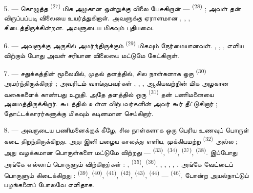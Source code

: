 5. --- கொழுத்த  \textsuperscript{(27)} மிக அழகான
 ஒன்றுக்கு விலை பேசுகிறான் —  \textsuperscript{(28)} ; அவள் தன் விருப்பப்படி விலையை
உயர்த்துகிறாள். அவளுக்கு ஏராளமான ,
, ,
 கிடைத்திருக்கின்றன. அவளுடைய
  மிகவும் புதியவை.

\VUsaut{4.0mm}
\VUsaut{3.0mm}

6. --- அவளுக்கு அருகில் அமர்ந்திருக்கும் 
\textsuperscript{(29)} மிகவும் நேர்மையானவள். ,
, , எளிய  விற்கும் போது அவள் சரியான விலையை மட்டுமே கேட்கிறாள்.

7. --- சதுக்கத்தின் மூலையில், முதல் தளத்தில், சில நாள்களாக ஒரு
 \textsuperscript{(30)} அமர்ந்திருக்கிறார் ;
அவரிடம் வாங்குபவர்கள் , , , 
ஆகியவற்றின் மிக அழகான வகைகளைக் காண்பது உறுதி. அதே தளத்தில் ஒரு
 \textsuperscript{(31)} தன் பணிமனையை
அமைத்திருக்கிறார். கூடத்தில் உள்ள விற்பவர்களின் 
அவர் கூர் தீட்டுகிறார் ; தோட்டக்காரர்களுக்கு மிகவும் கடினமான
  செய்கிறார்.

\VUsaut{4.0mm}
\VUsaut{3.0mm}

8. --- அவருடைய பணிமனைக்குக் கீழே, சில நாள்களாக ஒரு பெரிய உணவுப்
பொருள் கடை திறந்திருக்கிறது. அது இனி பழைய காலத்து எளிய,
முக்கியமற்ற  \textsuperscript{(32)} அல்ல ; அது
வழக்கமான பொருள்களை மட்டுமே விற்றது — 
\textsuperscript{(33)},  \textsuperscript{(34)},
 \textsuperscript{(37)}, 
\textsuperscript{(38)}. இப்போது அங்கே எல்லாப் பொருளும்
விற்கிறார்கள் : ,
 \textsuperscript{(35)},
 \textsuperscript{(36)}, ,
, , ,
. அங்கே வேட்டைப் பொருளும் கிடைக்கிறது :
 \textsuperscript{(39)}, 
\textsuperscript{(40)},  \textsuperscript{(41)},
 \textsuperscript{(42)}, 
\textsuperscript{(43)}, 
\textsuperscript{(44)} —  \textsuperscript{(46)},
 போன்ற அயல்நாட்டுப் பழங்களைப் போலவே
எளிதாக.

